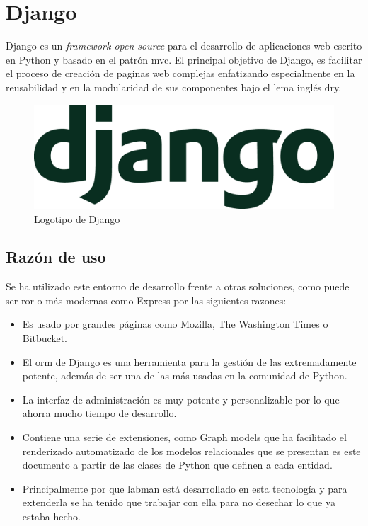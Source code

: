\section{Django}

Django es un \textit{framework open-source} para el desarrollo de aplicaciones web escrito en Python y basado en el patrón \acrfull{mvc}. El principal objetivo de Django, es facilitar el proceso de creación de paginas web complejas enfatizando especialmente en la reusabilidad y en la modularidad de sus componentes bajo el lema inglés \acrfull{dry}.

\begin{figure}[!htbp]
	\centering
	\includegraphics[scale=0.18]{fig/django_logo}
	\caption{Logotipo de Django}
\end{figure}

\subsection{Razón de uso}

Se ha utilizado este entorno de desarrollo frente a otras soluciones, como puede ser \acrfull{ror}\cite{RoR} o más modernas como Express\cite{Express} por las siguientes razones:

\begin{itemize}
	\item Es usado por grandes páginas como Mozilla, The Washington Times\cite{TWT} o Bitbucket\cite{Bitbucket}.
	\item El \acrshort{orm} de Django es una herramienta para la gestión de las  extremadamente potente, además de ser una de las más usadas en la comunidad de Python.
	\item La interfaz de administración es muy potente y personalizable por lo que ahorra mucho tiempo de desarrollo.
	\item Contiene una serie de extensiones, como Graph models\cite{GraphModel} que ha facilitado el renderizado automatizado de los modelos relacionales que se presentan es este documento a partir de las clases de Python que definen a cada entidad.
	\item Principalmente por que \acrshort{labman} está desarrollado en esta tecnología y para extenderla se ha tenido que trabajar con ella para no desechar lo que ya estaba hecho.
\end{itemize}

